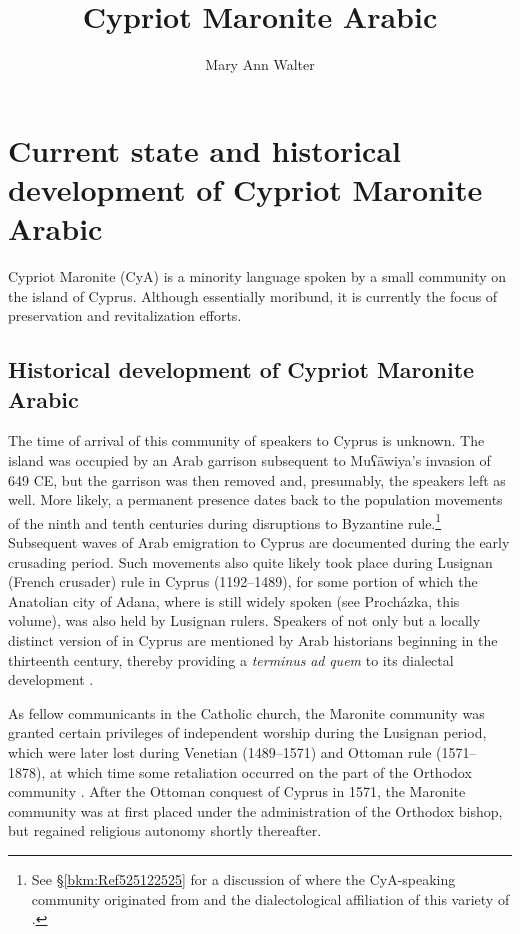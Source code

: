\documentclass[output=paper]{langsci/langscibook}
\author{Mary Ann Walter\affiliation{Middle East Technical University, Northern Cyprus Campus}}
\title{Cypriot Maronite Arabic}
\begin{document}
\maketitle

\section{Current state and historical development of Cypriot Maronite Arabic}

Cypriot Maronite  (CyA) is a minority language spoken by a small community on the island of {Cyprus}. Although essentially moribund, it is currently the focus of preservation and revitalization efforts.


\subsection{\label{bkm:Ref525121157}Historical development of Cypriot Maronite Arabic}

The time of arrival of this community of  speakers to {Cyprus} is unknown. The island was occupied by an Arab garrison subsequent to Muʕāwiya’s invasion of 649 CE, but the garrison was then removed and, presumably, the  speakers left as well. More likely, a permanent presence dates back to the population movements of the ninth and tenth centuries during disruptions to Byzantine rule.\footnote{See §\ref{bkm:Ref525122525} for a discussion of where the CyA-speaking community originated from and the dialectological affiliation of this variety of .} Subsequent waves of Arab emigration to {Cyprus} are documented during the early crusading period. Such movements also quite likely took place during {Lusignan} (French crusader) rule in {Cyprus} (1192–1489), for some portion of which the Anatolian city of Adana, where  is still widely spoken (see Procházka, this volume), was also held by {Lusignan} rulers. Speakers of not only  but a locally distinct version of  in {Cyprus} are mentioned by Arab historians beginning in the thirteenth century, thereby providing a \textit{terminus} \textit{ad} \textit{quem} to its dialectal development \citep{Borg2004}.


As fellow communicants in the Catholic church, the Maronite community was granted certain privileges of independent worship during the {Lusignan} period, which were later lost during Venetian (1489–1571) and Ottoman rule (1571–1878), at which time some retaliation occurred on the part of the Orthodox community \citep{Gulle2016}. After the Ottoman conquest of {Cyprus} in 1571, the Maronite community was at first placed under the administration of the Orthodox bishop, but regained religious autonomy shortly thereafter.
\end{document}

